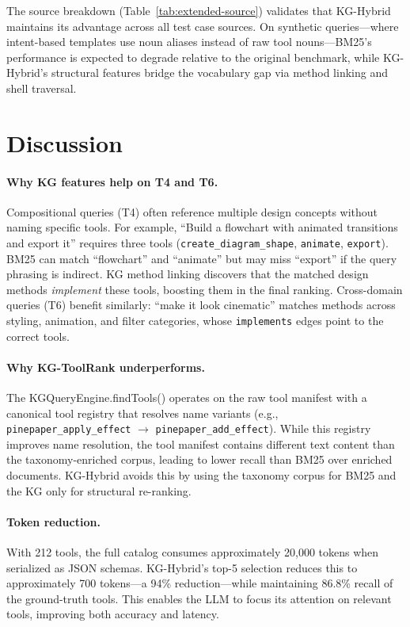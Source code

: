 \documentclass[11pt,a4paper]{article}
\begin{document}
The source breakdown (Table~\ref{tab:extended-source}) validates that KG-Hybrid maintains its advantage across all test case sources. On synthetic queries---where intent-based templates use noun aliases instead of raw tool nouns---BM25's performance is expected to degrade relative to the original benchmark, while KG-Hybrid's structural features bridge the vocabulary gap via method linking and shell traversal.

\section{Discussion}
\label{sec:discussion}

\paragraph{Why KG features help on T4 and T6.}
Compositional queries (T4) often reference multiple design concepts without naming specific tools. For example, ``Build a flowchart with animated transitions and export it'' requires three tools (\texttt{create\_diagram\_shape}, \texttt{animate}, \texttt{export}). BM25 can match ``flowchart'' and ``animate'' but may miss ``export'' if the query phrasing is indirect. KG method linking discovers that the matched design methods \emph{implement} these tools, boosting them in the final ranking. Cross-domain queries (T6) benefit similarly: ``make it look cinematic'' matches methods across styling, animation, and filter categories, whose \texttt{implements} edges point to the correct tools.

\paragraph{Why KG-ToolRank underperforms.}
The KGQueryEngine.findTools() operates on the raw tool manifest with a canonical tool registry that resolves name variants (e.g., \texttt{pinepaper\_apply\_effect} $\rightarrow$ \texttt{pinepaper\_add\_effect}). While this registry improves name resolution, the tool manifest contains different text content than the taxonomy-enriched corpus, leading to lower recall than BM25 over enriched documents. KG-Hybrid avoids this by using the taxonomy corpus for BM25 and the KG only for structural re-ranking.

\paragraph{Token reduction.}
With 212 tools, the full catalog consumes approximately 20,000 tokens when serialized as JSON schemas. KG-Hybrid's top-5 selection reduces this to approximately 700 tokens---a 94\% reduction---while maintaining 86.8\% recall of the ground-truth tools. This enables the LLM to focus its attention on relevant tools, improving both accuracy and latency.
\end{document}
